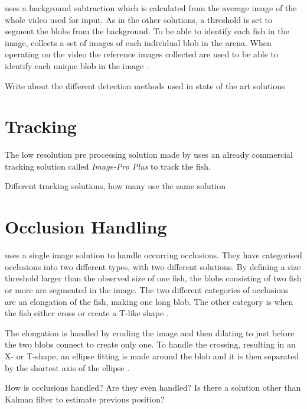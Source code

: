 \cite{idtracker2014} uses a background subtraction which is calculated from the average image of the whole video used for input. As in the other solutions, a threshold is set to segment the \gls{blob}s from the background. To be able to identify each fish in the image, \cite{idtracker2014} collects a set of images of each individual \gls{blob} in the arena. When operating on the video the reference images collected are used to be able to identify each unique \gls{blob} in the image \citep{idtracker2014}.


Write about the  different detection methods used in state of the art solutions


\section{Tracking}
The low resolution pre processing solution made by \cite{Dolado2015} uses an already commercial tracking solution called \textit{Image-Pro Plus} to track the fish.


Different tracking solutions, how many use the same solution

\section{Occlusion Handling}
\cite{Dolado2015} uses a single image solution to handle occurring occlusions. They have categorised occlusions into two different types, with two different solutions. By defining a size threshold larger than the observed size of one fish, the \gls{blob}s consisting of two fish or more are segmented in the image. The two different categories of occlusions are an elongation of the fish, making one long \gls{blob}. The other category is when the fish either cross or create a T-like shape \citep{Dolado2015}.

The elongation is handled by eroding the image and then dilating to just before the two \gls{blob}s connect to create only one. To handle the crossing, resulting in an X- or T-shape, an ellipse fitting is made around the \gls{blob} and it is then separated by the shortest axis of the ellipse \citep{Dolado2015}.


How is occlusions handled? Are they even handled? Is there a solution other than Kalman filter to estimate previous position?